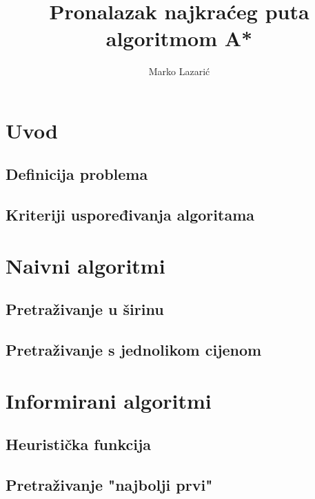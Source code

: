 \documentclass[times, utf8, seminar, numeric]{fer}
\begin{document}
\nocite{*}

\title{Pronalazak najkraćeg puta algoritmom A*}

\author{Marko Lazarić}


\maketitle

\tableofcontents

\chapter{Uvod}

\section{Definicija problema}

\section{Kriteriji uspoređivanja algoritama}


\chapter{Naivni algoritmi}


\section{Pretraživanje u širinu}

\clearpage
\section{Pretraživanje s jednolikom cijenom}


\chapter{Informirani algoritmi}

\section{Heuristička funkcija}

\section{Pretraživanje "najbolji prvi"}

\end{document}
